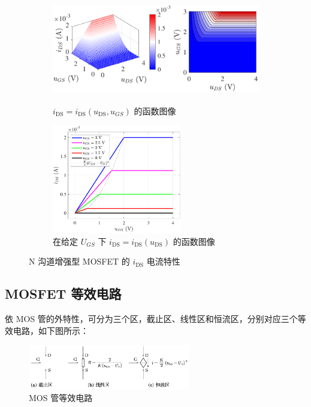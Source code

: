 \documentclass[UTF8]{report}
\theoremstyle{MyLineTheoremStyle} %
\theoremstyle{MyBlockTheoremStyle} %
\theoremstyle{MySubsubsectionStyle} %
\begin{document}
\begin{figure}[H]\centering
\begin{subfigure}[t]{0.67\textwidth}\centering
    \includegraphics[height=135pt]{assets/2/MOS管外特性.pdf}
    \caption{ $i_{\text{DS}} = i_{\text{DS}}(u_{\text{DS}}, u_{GS})$ 的函数图像 }
\end{subfigure}\begin{subfigure}[t]{0.33\textwidth}\centering
    \includegraphics[height=135pt]{assets/2/MOS管外特性 (2).pdf}
    \caption{ 在给定 $U_{GS}$ 下 $i_{\text{DS}} = i_{\text{DS}}(u_{\text{DS}})$ 的函数图像 }
\end{subfigure}
\caption{ N 沟道增强型 MOSFET 的 $i_{\text{DS}}$ 电流特性 }\label{MOS 管的 iDS 电流特性}
\end{figure}

\subsection{MOSFET 等效电路}

依 MOS 管的外特性，可分为三个区，截止区、线性区和恒流区，分别对应三个等效电路，如下图所示：
\begin{figure}[H]\centering
\includegraphics[width=0.63\textwidth]{assets/2/MOS管等效电路.png}
\caption{ MOS 管等效电路}\label{MOS管等效电路}
\end{figure}
\end{document}
